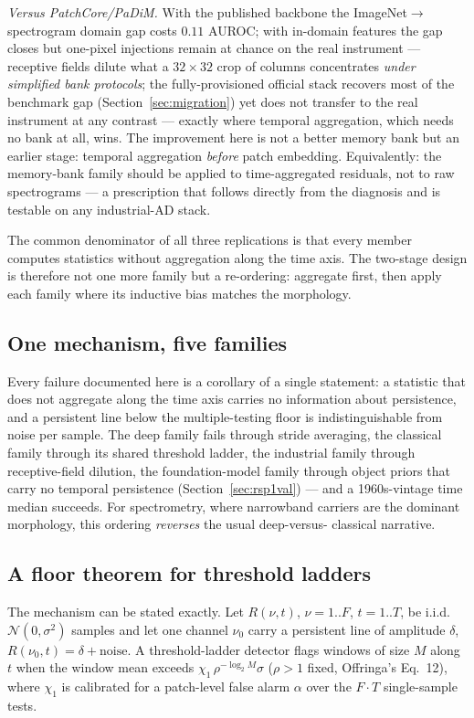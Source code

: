 \documentclass[journal]{IEEEtran}
\begin{document}
\emph{Versus PatchCore/PaDiM.}  With the published backbone the
ImageNet$\to$spectrogram domain gap costs $0.11$ AUROC; with in-domain
features the gap closes but one-pixel injections remain at chance on the
real instrument --- receptive fields dilute what a $32\times32$ crop of
columns concentrates \emph{under simplified bank protocols}; the
fully-provisioned official stack recovers most of the benchmark gap
(Section~\ref{sec:migration}) yet does not transfer to the real
instrument at any contrast --- exactly where temporal aggregation,
which needs no bank at all, wins.  The improvement here is not a better memory bank
but an earlier stage: temporal aggregation \emph{before} patch embedding.
Equivalently: the memory-bank family should be applied to
time-aggregated residuals, not to raw spectrograms --- a prescription that
follows directly from the diagnosis and is testable on any industrial-AD
stack.

The common denominator of all three replications is that every member
computes statistics without aggregation along the time axis.  The two-stage
design is therefore not one more family but a re-ordering: aggregate first,
then apply each family where its inductive bias matches the morphology.

\subsection{One mechanism, five families}
Every failure documented here is a corollary of a single statement: a
statistic that does not aggregate along the time axis carries no information
about persistence, and a persistent line below the multiple-testing floor is
indistinguishable from noise per sample.  The deep family fails through
stride averaging, the classical family through its shared threshold ladder,
the industrial family through receptive-field dilution, the foundation-model
family through object priors that carry no temporal persistence
(Section~\ref{sec:rsp1val}) --- and a 1960s-vintage
time median succeeds.  For spectrometry, where narrowband carriers are the
dominant morphology, this ordering \emph{reverses} the usual deep-versus-
classical narrative.

\subsection{A floor theorem for threshold ladders}
\label{sec:floor}
The mechanism can be stated exactly.  Let $R(\nu,t)$, $\nu{=}1..F$,
$t{=}1..T$, be i.i.d. $\mathcal{N}(0,\sigma^2)$ samples and let one channel
$\nu_0$ carry a persistent line of amplitude $\delta$,
$R(\nu_0,t)=\delta+\text{noise}$.  A threshold-ladder detector flags windows
of size $M$ along $t$ when the window mean exceeds
$\chi_1\,\rho^{-\log_2 M}\sigma$ ($\rho>1$ fixed, Offringa's Eq.~12), where
$\chi_1$ is calibrated for a patch-level false alarm $\alpha$ over the
$F\cdot T$ single-sample tests.
\end{document}
